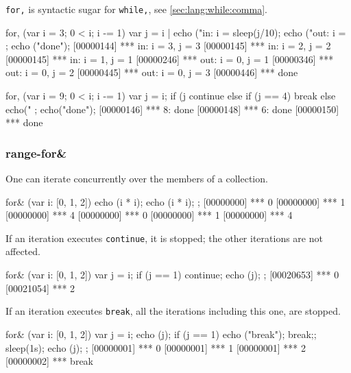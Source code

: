 \lstinline|for,| is syntactic sugar for \lstinline|while,|, see
\autoref{sec:lang:while:comma}.

\begin{urbiscript}
for, (var i = 3; 0 < i; i -= 1)
{
  var j = i |
  echo ("in: i = %
  sleep(j/10);
  echo ("out: i = %
};
echo ("done");
[00000144] *** in: i = 3, j = 3
[00000145] *** in: i = 2, j = 2
[00000145] *** in: i = 1, j = 1
[00000246] *** out: i = 0, j = 1
[00000346] *** out: i = 0, j = 2
[00000445] *** out: i = 0, j = 3
[00000446] *** done
\end{urbiscript}

\begin{urbiscript}
for, (var i = 9; 0 < i; i -= 1)
{
  var j = i;
  if (j %
    continue
  else if (j == 4)
    break
  else
    echo("%
};
echo("done");
[00000146] *** 8: done
[00000148] *** 6: done
[00000150] *** done
\end{urbiscript}


\subsubsection{range-for\&}
\label{sec:lang:for:each:and}

One can iterate concurrently over the members of a collection.

\begin{urbiscript}
for& (var i: [0, 1, 2])
{
  echo (i * i);
  echo (i * i);
};
[00000000] *** 0
[00000000] *** 1
[00000000] *** 4
[00000000] *** 0
[00000000] *** 1
[00000000] *** 4
\end{urbiscript}

If an iteration executes \lstinline|continue|, it is stopped; the
other iterations are not affected.

\begin{urbiscript}
for& (var i: [0, 1, 2])
{
  var j = i;
  if (j == 1)
    continue;
  echo (j);
};
[00020653] *** 0
[00021054] *** 2
\end{urbiscript}

If an iteration executes \lstinline|break|, all the iterations
including this one, are stopped.

\begin{urbiscript}
for& (var i: [0, 1, 2])
{
  var j = i;
  echo (j);
  if (j == 1)
   { echo ("break");
    break;};
  sleep(1s);
  echo (j);
};
[00000001] *** 0
[00000001] *** 1
[00000001] *** 2
[00000002] *** break
\end{urbiscript}

